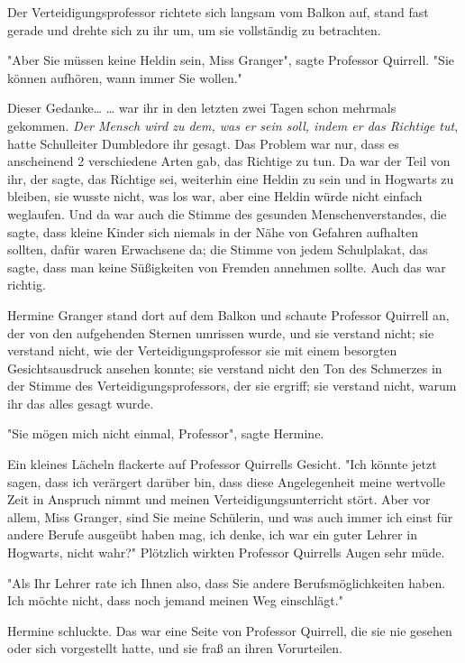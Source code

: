 {Der Verteidigungsprofessor richtete sich langsam vom Balkon auf, stand fast gerade und drehte sich zu ihr um, um sie vollständig zu betrachten.

"Aber Sie müssen keine Heldin sein, Miss Granger", sagte Professor Quirrell. "Sie können aufhören, wann immer Sie wollen."

Dieser Gedanke… … war ihr in den letzten zwei Tagen schon mehrmals gekommen. \emph{Der Mensch wird zu dem, was er sein soll, indem er das Richtige tut}, hatte Schulleiter Dumbledore ihr gesagt. Das Problem war nur, dass es anscheinend 2 verschiedene Arten gab, das Richtige zu tun. Da war der Teil von ihr, der sagte, das Richtige sei, weiterhin eine Heldin zu sein und in Hogwarts zu bleiben, sie wusste nicht, was los war, aber eine Heldin würde nicht einfach weglaufen. Und da war auch die Stimme des gesunden Menschenverstandes, die sagte, dass kleine Kinder sich niemals in der Nähe von Gefahren aufhalten sollten, dafür waren Erwachsene da; die Stimme von jedem Schulplakat, das sagte, dass man keine Süßigkeiten von Fremden annehmen sollte. Auch das war richtig.

Hermine Granger stand dort auf dem Balkon und schaute Professor Quirrell an, der von den aufgehenden Sternen umrissen wurde, und sie verstand nicht; sie verstand nicht, wie der Verteidigungsprofessor sie mit einem besorgten Gesichtsausdruck ansehen konnte; sie verstand nicht den Ton des Schmerzes in der Stimme des Verteidigungsprofessors, der sie ergriff; sie verstand nicht, warum ihr das alles gesagt wurde.

"Sie mögen mich nicht einmal, Professor", sagte Hermine.

Ein kleines Lächeln flackerte auf Professor Quirrells Gesicht. "Ich könnte jetzt sagen, dass ich verärgert darüber bin, dass diese Angelegenheit meine wertvolle Zeit in Anspruch nimmt und meinen Verteidigungsunterricht stört. Aber vor allem, Miss Granger, sind Sie meine Schülerin, und was auch immer ich einst für andere Berufe ausgeübt haben mag, ich denke, ich war ein guter Lehrer in Hogwarts, nicht wahr?" Plötzlich wirkten Professor Quirrells Augen sehr müde.

"Als Ihr Lehrer rate ich Ihnen also, dass Sie andere Berufsmöglichkeiten haben. Ich möchte nicht, dass noch jemand meinen Weg einschlägt."

Hermine schluckte. Das war eine Seite von Professor Quirrell, die sie nie gesehen oder sich vorgestellt hatte, und sie fraß an ihren Vorurteilen.

}
